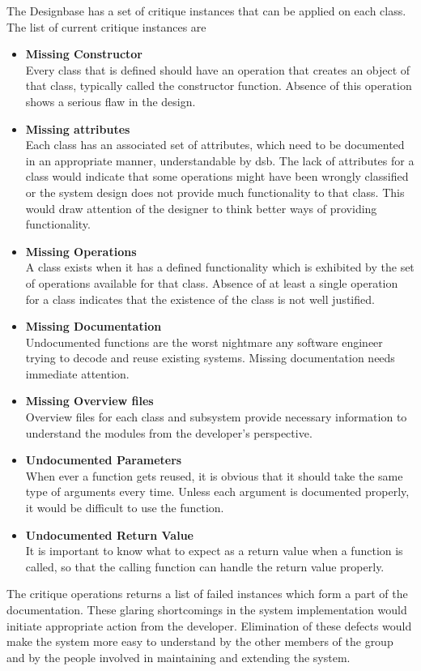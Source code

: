 The Designbase has a set of critique instances that can be applied on
each class.  The list of current critique instances are
\begin{itemize}
\item{\bf Missing Constructor}\\ Every class that is defined should
  have an operation that creates an object of that class, typically
  called the constructor function.  Absence of this operation shows a
  serious flaw in the design.
\item{\bf Missing attributes}\\ Each class has an associated set of
  attributes, which need to be documented in an appropriate manner,
  understandable by dsb.  The lack of attributes for a class would
  indicate that some operations might have been wrongly classified or
  the system design does not provide much functionality to that class.
  This would draw attention of the designer to think better ways of
  providing functionality.
\item{\bf Missing Operations} \\ A class exists when it has a defined
  functionality which is exhibited by the set of operations available
  for that class.  Absence of at least a single operation for a class
  indicates that the existence of the class is not well justified.
\item{\bf Missing Documentation}\\ Undocumented functions are the
  worst nightmare any software engineer trying to decode and reuse
  existing systems.  Missing documentation needs immediate attention.
\item{\bf Missing Overview files}\\ Overview files for each class and
  subsystem provide necessary information to understand the modules from
  the developer's perspective.
\item{\bf Undocumented Parameters}\\ When ever a function gets reused,
  it is obvious that it should take the same type of arguments every
  time.  Unless each argument is documented properly, it would be
  difficult to use the function.
\item{\bf Undocumented Return Value}\\ It is important to know what to
  expect as a return value when a function is called, so that the
  calling function can handle the return value properly.
\end{itemize}

The critique operations returns a list of failed instances which form
a part of the documentation.  These glaring shortcomings in the system
implementation would initiate appropriate action from the developer.
Elimination of these defects would make the system more easy to
understand by the other members of the group and by the people
involved in maintaining and extending the system.


